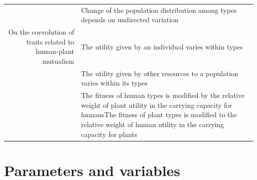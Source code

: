 \documentclass[
]{book}
\begin{document}
\begin{longtable}[]{@{}rl@{}}
\begin{minipage}[t]{0.45\columnwidth}
\end{minipage} & \begin{minipage}[t]{0.49\columnwidth}\raggedright
Change of the population distribution among types depends on undirected variation\strut
\end{minipage}\tabularnewline
\begin{minipage}[t]{0.45\columnwidth}\raggedleft
On the coevolution of traits related to human-plant mutualism\strut
\end{minipage} & \begin{minipage}[t]{0.49\columnwidth}\raggedright
The utility given by an individual varies within types\strut
\end{minipage}\tabularnewline
\begin{minipage}[t]{0.45\columnwidth}\raggedleft
﻿\strut
\end{minipage} & \begin{minipage}[t]{0.49\columnwidth}\raggedright
The utility given by other resources to a population varies within its types\strut
\end{minipage}\tabularnewline
\begin{minipage}[t]{0.45\columnwidth}\raggedleft
﻿\strut
\end{minipage} & \begin{minipage}[t]{0.49\columnwidth}\raggedright
The fitness of human types is modified by the relative weight of plant utility in the carrying capacity for humansThe fitness of plant types is modified to the relative weight of human utility in the carrying capacity for plants\strut
\end{minipage}\tabularnewline
\bottomrule
\end{longtable}

\newpage

\hypertarget{parameters-and-variables}{%
\section*{Parameters and variables}\label{parameters-and-variables}}
\end{document}
